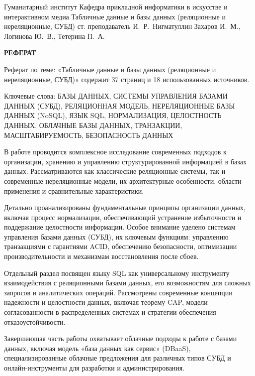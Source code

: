 \documentclass{SibFU-docs}
\begin{document}
\renewcommand{\contentsname}{}
\mycovertitle
{Гуманитарный институт}
{Кафедра прикладной информатики в искусстве и интерактивном медиа}
{Табличные данные и базы данных (реляционные и нереляционные, СУБД)}
{ст. преподаватель И.~Р.~Нигматуллин}
{Захаров И.~М., Логинова Ю.~В., Тетерина П.~А.}
 
\begin{center}
\bfseries РЕФЕРАТ
\end{center}
\noindent

Реферат по теме: «Табличные данные и базы данных (реляционные и нереляционные, СУБД)» содержит 37 страниц и 18 использованных источников.

Ключевые слова: БАЗЫ ДАННЫХ, СИСТЕМЫ УПРАВЛЕНИЯ БАЗАМИ ДАННЫХ (СУБД), РЕЛЯЦИОННАЯ МОДЕЛЬ, НЕРЕЛЯЦИОННЫЕ БАЗЫ ДАННЫХ (NoSQL), ЯЗЫК SQL, НОРМАЛИЗАЦИЯ, ЦЕЛОСТНОСТЬ ДАННЫХ, ОБЛАЧНЫЕ БАЗЫ ДАННЫХ, ТРАНЗАКЦИИ, МАСШТАБИРУЕМОСТЬ, БЕЗОПАСНОСТЬ ДАННЫХ

В работе проводится комплексное исследование современных подходов к организации, хранению и управлению структурированной информацией в базах данных. Рассматриваются как классические реляционные системы, так и современные нереляционные модели, их архитектурные особенности, области применения и сравнительные характеристики.

Детально проанализированы фундаментальные принципы организации данных, включая процесс нормализации, обеспечивающий устранение избыточности и поддержание целостности информации. Особое внимание уделено системам управления базами данных (СУБД), их ключевым функциям: управлению транзакциями с гарантиями ACID, обеспечению безопасности, оптимизации производительности и механизмам восстановления после сбоев.

Отдельный раздел посвящен языку SQL как универсальному инструменту взаимодействия с реляционными базами данных, его возможностям для сложных запросов и аналитических операций. Рассмотрены современные концепции надежности и целостности данных, включая теорему CAP, модели согласованности в распределенных системах и стратегии обеспечения отказоустойчивости.

Завершающая часть работы охватывает облачные подходы к работе с базами данных, включая модель «база данных как сервис» (DBaaS), специализированные облачные предложения для различных типов СУБД и онлайн-инструменты для разработки и администрирования.
\end{document}
